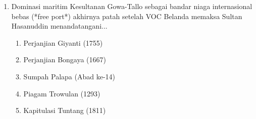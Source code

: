 \documentclass[12pt, a4paper]{article}
\begin{document}
\begin{enumerate}[label=\arabic*.]
    \item Dominasi maritim Kesultanan Gowa-Tallo sebagai bandar niaga internasional bebas (*free port*) akhirnya patah setelah VOC Belanda memaksa Sultan Hasanuddin menandatangani...
    \begin{enumerate}[label=\Alph*.]
        \item Perjanjian Giyanti (1755)
        \item Perjanjian Bongaya (1667)
        \item Sumpah Palapa (Abad ke-14)
        \item Piagam Trowulan (1293)
        \item Kapitulasi Tuntang (1811)
    \end{enumerate}
\end{enumerate}
\end{document}
